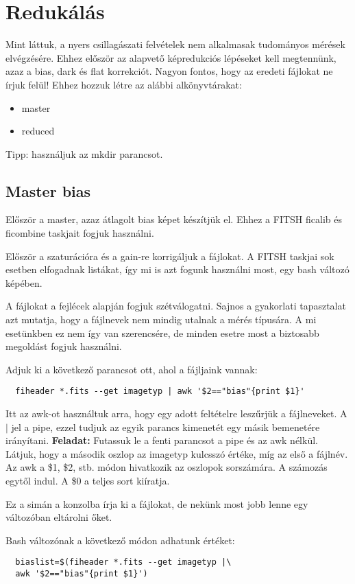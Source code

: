 \documentclass{article}
\begin{document}
\section{Redukálás}

Mint láttuk, a nyers csillagászati felvételek nem alkalmasak tudományos mérések
elvégzésére. Ehhez először az alapvető képredukciós lépéseket kell megtennünk,
azaz a bias, dark és flat korrekciót.
Nagyon fontos, hogy az eredeti fájlokat ne írjuk felül!
Ehhez hozzuk létre az alábbi alkönyvtárakat:
\begin{itemize}
  \item master
  \item reduced
\end{itemize}
Tipp: használjuk az mkdir parancsot.

\subsection{Master bias}
Először a master, azaz átlagolt bias képet készítjük el. Ehhez a FITSH ficalib
és ficombine taskjait fogjuk használni.

Először a szaturációra és a gain-re korrigáljuk a fájlokat. A FITSH taskjai sok
esetben elfogadnak listákat, így mi is azt fogunk használni most, egy bash
változó képében.

A fájlokat a fejlécek alapján fogjuk szétválogatni. Sajnos a gyakorlati
tapasztalat azt mutatja, hogy a fájlnevek nem mindig utalnak a mérés típusára.
A mi esetünkben ez nem így van szerencsére, de minden esetre most a biztosabb
megoldást fogjuk használni.

Adjuk ki a következő parancsot ott, ahol a fájljaink vannak:
\begin{verbatim}
  fiheader *.fits --get imagetyp | awk '$2=="bias"{print $1}'
\end{verbatim}

Itt az awk-ot használtuk arra, hogy egy adott feltételre leszűrjük a
fájlneveket. A $|$ jel a pipe, ezzel tudjuk az egyik parancs kimenetét egy
másik bemenetére irányítani.
{\bf Feladat:}
Futassuk le a fenti parancsot a pipe és az awk nélkül. Látjuk, hogy a második
oszlop az imagetyp kulcsszó értéke, míg az első a fájlnév. Az awk a \$1, \$2,
stb. módon hivatkozik az oszlopok sorszámára. A számozás egytől indul. A \$0 a
teljes sort kiíratja.

Ez a simán a konzolba írja ki a fájlokat, de nekünk most jobb lenne egy
változóban eltárolni őket.

Bash változónak a következő módon adhatunk értéket:
\begin{verbatim}
  biaslist=$(fiheader *.fits --get imagetyp |\
  awk '$2=="bias"{print $1}')
\end{verbatim}
\end{document}
